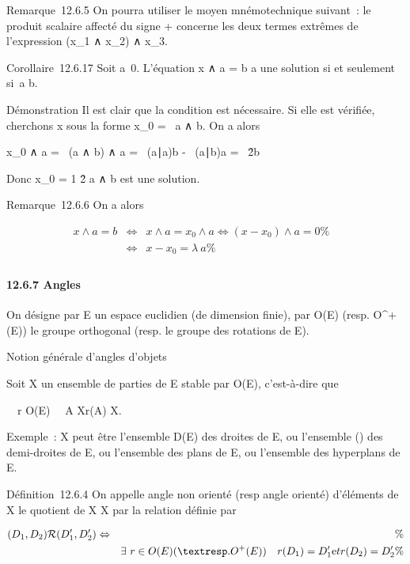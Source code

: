 \documentclass[]{article}
\begin{document}
Remarque~12.6.5 On pourra utiliser le moyen mnémotechnique suivant~: le
produit scalaire affecté du signe + concerne les deux termes extrêmes de
l'expression (x_1 ∧ x_2) ∧ x_3.

Corollaire~12.6.17 Soit a\neq~0. L'équation x ∧ a
= b a une solution si et seulement si~a \bot b.

Démonstration Il est clair que la condition est nécessaire. Si elle est
vérifiée, cherchons x sous la forme x_0 = \lambda~a ∧ b. On a alors

x_0 ∧ a = \lambda~(a ∧ b) ∧ a = \lambda~(a∣a)b -
\lambda~(a∣b)a =
\lambda~\a\^2b

Donc x_0 = 1 \over
\a\^2 a ∧
b est une solution.

Remarque~12.6.6 On a alors

\begin{align*} x ∧ a = b&
\Leftrightarrow & x ∧ a = x_0 ∧ a
\Leftrightarrow (x - x_0) ∧ a = 0\%&
\\ & \Leftrightarrow & x -
x_0 = \lambda~a \%& \\
\end{align*}

\paragraph{12.6.7 Angles}

On désigne par E un espace euclidien (de dimension finie), par O(E)
(resp. O^+(E)) le groupe orthogonal (resp. le groupe des
rotations de E).

Notion générale d'angles d'objets

Soit X un ensemble de parties de E stable par O(E), c'est-à-dire que

\forall~~r \in O(E)\quad
\forall~~A \in X\quad r(A) \in X.

Exemple~: X peut être l'ensemble D(E) des droites de E, ou l'ensemble
\tildeD() des demi-droites de E, ou l'ensemble des
plans de E, ou l'ensemble des hyperplans de E.

Définition~12.6.4 On appelle angle non orienté (resp angle orienté)
d'éléments de X le quotient de X \times X par la relation  définie par

\begin{align*}
(D_1,D_2)\mathcal{R}(D_1',D_2')
\Leftrightarrow&& \%& \\
& & \exists~r \in O(E) (\textresp.
O^+(E))\quad r(D_ 1) =
D_1'\text et r(D_2) =
D_2'\%& \\
\end{align*}
\end{document}
